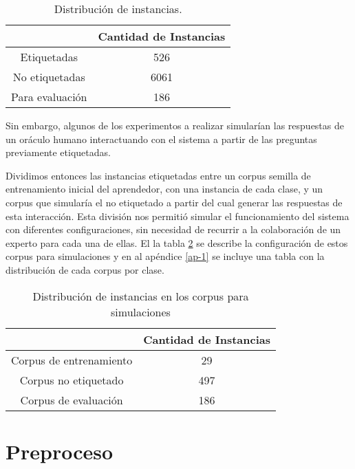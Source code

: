 \begin{table}[h!]
\centering
\begin{tabular}{c c}
     & Cantidad de Instancias\\ [0.5ex]
    \hline
    Etiquetadas & 526 \\ [0.5ex]
    No etiquetadas & 6061 \\ [0.5ex]
    Para evaluación & 186 \\[1ex]
    \hline
\end{tabular}
\caption{Distribución de instancias.}\label{dist-corpus}
\end{table}

Sin embargo, algunos de los experimentos a realizar simularían las respuestas de un oráculo humano interactuando con el sistema a partir de las preguntas previamente etiquetadas.

Dividimos entonces las instancias etiquetadas entre un corpus semilla de entrenamiento inicial del aprendedor, con una instancia de cada clase, y un corpus que simularía el no etiquetado a partir del cual generar las respuestas de esta interacción. Esta división nos permitió simular el funcionamiento del sistema con diferentes configuraciones, sin necesidad de recurrir a la colaboración de un experto para cada una de ellas. El la tabla \ref{corpus-para-simulacion} se describe la configuración de estos corpus para simulaciones y en al apéndice \ref{ap-1} se incluye una tabla con la distribución de cada corpus por clase.


\begin{table}[h!]
\centering
\begin{tabular}{c c}
     & Cantidad de Instancias\\ [0.5ex]
    \hline
    Corpus de entrenamiento & 29 \\ [0.5ex]
    Corpus no etiquetado & 497 \\ [0.5ex]
    Corpus de evaluación & 186 \\[1ex]
    \hline
\end{tabular}
\caption{Distribución de instancias en los corpus para simulaciones}\label{corpus-para-simulacion}
\end{table}

\section{Preproceso}

